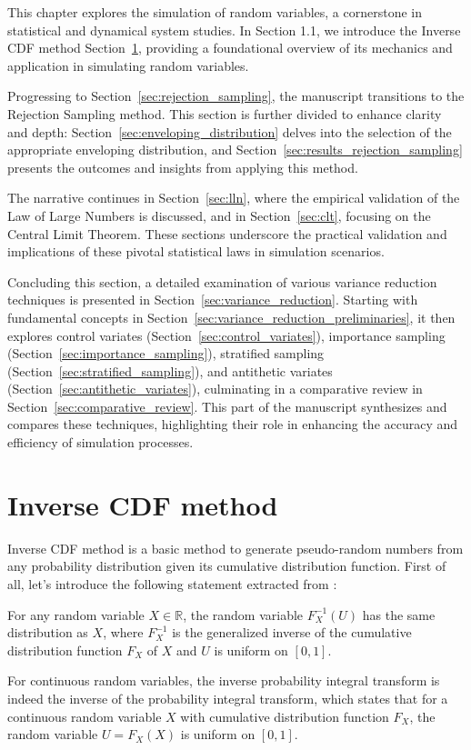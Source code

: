 \documentclass{report}
\begin{document}
This chapter explores the simulation of random variables, a cornerstone in statistical and dynamical system studies. In Section 1.1, we introduce the Inverse CDF method Section~\ref{sec:inverse_cdf}, providing a foundational overview of its mechanics and application in simulating random variables.

Progressing to Section~\ref{sec:rejection_sampling}, the manuscript transitions to the Rejection Sampling method. This section is further divided to enhance clarity and depth: Section~\ref{sec:enveloping_distribution} delves into the selection of the appropriate enveloping distribution, and Section~\ref{sec:results_rejection_sampling} presents the outcomes and insights from applying this method.

The narrative continues in Section~\ref{sec:lln}, where the empirical validation of the Law of Large Numbers is discussed, and in Section~\ref{sec:clt}, focusing on the Central Limit Theorem. These sections underscore the practical validation and implications of these pivotal statistical laws in simulation scenarios.

Concluding this section, a detailed examination of various variance reduction techniques is presented in Section~\ref{sec:variance_reduction}. Starting with fundamental concepts in Section~\ref{sec:variance_reduction_preliminaries}, it then explores control variates (Section~\ref{sec:control_variates}), importance sampling (Section~\ref{sec:importance_sampling}), stratified sampling (Section~\ref{sec:stratified_sampling}), and antithetic variates (Section~\ref{sec:antithetic_variates}), culminating in a comparative review in Section~\ref{sec:comparative_review}. This part of the manuscript synthesizes and compares these techniques, highlighting their role in enhancing the accuracy and efficiency of simulation processes.

\section{Inverse CDF method}
\label{sec:inverse_cdf}

Inverse CDF method is a basic method to generate pseudo-random numbers from any probability distribution given its cumulative distribution function. First of all, let's introduce the following statement extracted from \cite{wikitInverseTransformSampling}:

\begin{theorem}
	For any random variable $X \in \mathbb{R}$, the random variable $F_X^{-1}(U)$ has the same distribution as $X$, where $F_X^{-1}$ is the generalized inverse of the cumulative distribution function $F_X$ of $X$ and $U$ is uniform on $[0,1]$.

	For continuous random variables, the inverse probability integral transform is indeed the inverse of the probability integral transform, which states that for a continuous random variable $X$ with cumulative distribution function $F_X$, the random variable $U = F_X(X)$ is uniform on $[0,1]$.
\end{theorem}
\end{document}
